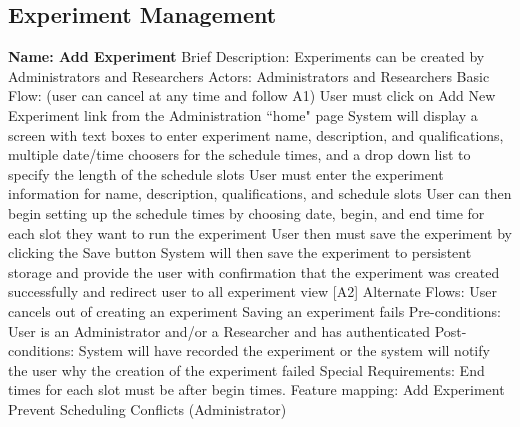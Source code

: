 \subsection{Experiment Management}
\begin{outline}[enumerate]

\1 {\bf Name: Add Experiment}
\2 Brief Description: Experiments can be created by Administrators and Researchers
\2 Actors: Administrators and Researchers
\2 Basic Flow: (user can cancel at any time and follow A1)
\3 User must click on Add New Experiment link from the Administration ``home" page
\3 System will display a screen with text boxes to enter experiment name, description,  and qualifications, multiple date/time choosers for the schedule times, and a drop down list to specify the length of the schedule slots
\3 User must enter the experiment information for name, description, qualifications, and schedule slots
\3 User can then begin setting up the schedule times by choosing date, begin, and end time for each slot they want to run the experiment
\3 User then must save the experiment by clicking the Save button
\3 System will then save the experiment to persistent storage and provide the user with confirmation that the experiment was created successfully and redirect user to all experiment view [A2]
\2 Alternate Flows:
\3 [A1] User cancels out of creating an experiment
\3 [A2] Saving an experiment fails
\2 Pre-conditions:
\3 User is an Administrator and/or a Researcher and has authenticated
\2 Post-conditions:
\3 System will have recorded the experiment or the system will notify the user why the creation of the experiment failed
\2 Special Requirements:
\3 End times for each slot must be after begin times.
\2 Feature mapping:
\3 Add Experiment
\3 Prevent Scheduling Conflicts (Administrator)


\end{outline}
